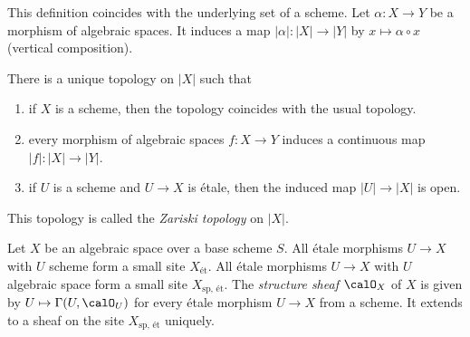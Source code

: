     This definition coincides with the underlying set of a scheme.
    Let \(\alpha: X \to Y\) be a morphism of algebraic spaces.
    It induces a map \(|\alpha|: |X| \to |Y|\) by \(x \mapsto \alpha \circ x\) (vertical composition).

    \begin{proposition}\label{prop:underlying_topological_space_of_algebraic_space}
        There is a unique topology on \(|X|\) such that
        \begin{enumerate}
            \item if \(X\) is a scheme, then the topology coincides with the usual topology.
            \item every morphism of algebraic spaces \(f: X \to Y\) induces a continuous map \(|f|: |X| \to |Y|\).
            \item if \(U\) is a scheme and \(U \to X\) is \'etale, then the induced map \(|U| \to |X|\) is open.
        \end{enumerate}
    \end{proposition}

    This topology is called the \emph{Zariski topology} on \(|X|\).

    \begin{definition}\label{def:structure_sheaf_of_algebraic_space}
        Let \(X\) be an algebraic space over a base scheme \(S\).
        All \'etale morphisms \(U \to X\) with \(U\) scheme form a small site \(X_{\text{\'et}}\).
        All \'etale morphisms \(U \to X\) with \(U\) algebraic space form a small site \(X_{\text{sp, \'et}}\).
        The \emph{structure sheaf} \(\calO_X\) of \(X\) is given by \(U \mapsto \Gamma(U,\calO_U)\) for every \'etale morphism \(U \to X\) from a scheme.
        It extends to a sheaf on the site \(X_{\text{sp, \'et}}\) uniquely.
    \end{definition}


